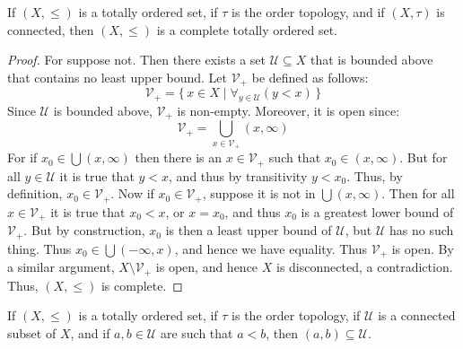 \documentclass[oneside]{book}                                                  %
\begin{document}
            \begin{theorem}
                If $(X,\leq)$ is a totally ordered set, if $\tau$ is the order
                topology, and if $(X,\tau)$ is connected, then $(X,\leq)$ is
                a complete totally ordered set.
            \end{theorem}
            \begin{proof}
                For suppose not. Then there exists a set
                $\mathcal{U}\subseteq{X}$ that is bounded above that contains
                no least upper bound. Let $\mathcal{V}_{+}$ be defined as
                follows:
                \begin{equation}
                    \mathcal{V}_{+}=\{\,x\in{X}\;|\;
                        \forall_{y\in\mathcal{U}}(y<x)\,\}
                \end{equation}
                Since $\mathcal{U}$ is bounded above, $\mathcal{V}_{+}$ is
                non-empty. Moreover, it is open since:
                \begin{equation}
                    \mathcal{V}_{+}=
                    \bigcup_{x\in\mathcal{V}_{+}}(x,\infty)
                \end{equation}
                For if $x_{0}\in\bigcup(x,\infty)$ then there is an
                $x\in\mathcal{V}_{+}$ such that $x_{0}\in(x,\infty)$. But
                for all $y\in\mathcal{U}$ it is true that $y<x$, and thus by
                transitivity $y<x_{0}$. Thus, by definition,
                $x_{0}\in\mathcal{V}_{+}$. Now if $x_{0}\in\mathcal{V}_{+}$,
                suppose it is not in $\bigcup(x,\infty)$. Then for all
                $x\in\mathcal{V}_{+}$ it is true that $x_{0}<x$, or $x=x_{0}$,
                and thus $x_{0}$ is a greatest lower bound of $\mathcal{V}_{+}$.
                But by construction, $x_{0}$ is then a least upper bound of
                $\mathcal{U}$, but $\mathcal{U}$ has no such thing. Thus
                $x_{0}\in\bigcup(\minus\infty,x)$, and hence we have equality.
                Thus $\mathcal{V}_{+}$ is open. By a similar argument,
                ${X}\setminus\mathcal{V}_{+}$ is open, and hence $X$ is
                disconnected, a contradiction. Thus, $(X,\leq)$ is complete.
            \end{proof}
            \begin{theorem}
                If $(X,\leq)$ is a totally ordered set, if $\tau$ is the order
                topology, if $\mathcal{U}$ is a connected subset of $X$, and if
                $a,b\in\mathcal{U}$ are such that $a<b$, then
                $(a,b)\subseteq\mathcal{U}$.
            \end{theorem}
\end{document}
